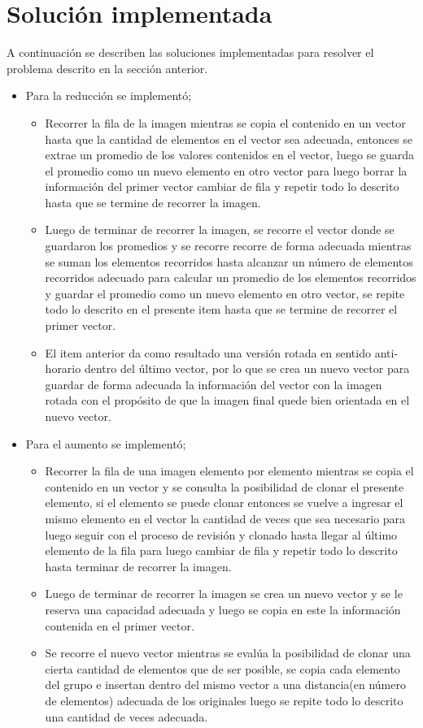 \documentclass{article}
\begin{document}
	\section{Solución implementada} \label{contenido}
	A continuación se describen las soluciones implementadas para resolver el problema descrito en la sección anterior.
	\begin{itemize}
		\item Para la reducción se implementó;
		\begin{itemize}
			\item Recorrer la fila de la imagen mientras se copia el contenido en un vector hasta que la cantidad de elementos en el vector sea adecuada, entonces se extrae un promedio de los valores contenidos en el vector, luego se guarda el promedio como un nuevo elemento en otro vector para luego borrar la información del primer vector cambiar de fila y repetir todo lo descrito hasta que se termine de recorrer la imagen.
			\item Luego de terminar de recorrer la imagen, se recorre el vector donde se guardaron los promedios y se recorre recorre de forma adecuada mientras se suman los elementos recorridos hasta alcanzar un número de elementos recorridos adecuado para calcular un promedio de los elementos recorridos y guardar el promedio como un nuevo elemento en otro vector, se repite todo lo descrito en el presente item hasta que se termine de recorrer el primer vector.
			\item El item anterior da como resultado una versión rotada en sentido anti-horario dentro del último vector, por lo que se crea un nuevo vector para guardar de forma adecuada la información del vector con la imagen rotada con el propósito de que la imagen final quede bien orientada en el nuevo vector.
		\end{itemize}
		\item Para el aumento se implementó;
		\begin{itemize}
			\item Recorrer la fila de una imagen elemento por elemento mientras se copia el contenido en un vector y se consulta la posibilidad de clonar el presente elemento, si el elemento se puede clonar entonces se vuelve a ingresar el mismo elemento en el vector la cantidad de veces que sea necesario para luego seguir con el proceso de revisión y clonado hasta llegar al último elemento de la fila para luego cambiar de fila y repetir todo lo descrito hasta terminar de recorrer la imagen.
			\item Luego de terminar de recorrer la imagen se crea un nuevo vector y se le reserva una capacidad adecuada y luego se copia en este la información contenida en el primer vector.
			\item Se recorre el nuevo vector mientras se evalúa la posibilidad de clonar una cierta cantidad de elementos que de ser posible, se copia cada elemento del grupo e insertan dentro del mismo vector a una distancia(en número de elementos) adecuada de los originales luego se repite todo lo descrito una cantidad de veces adecuada.
		\end{itemize}
	\end{itemize}
\end{document}
